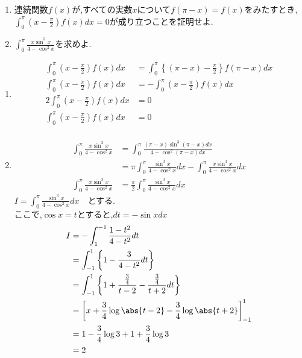 \begin{problem}
  \begin{enumerate}[(1)\ ]
    \item 連続関数$f(x)$が,すべての実数$x$について$f(\pi-x)=f(x)$をみたすとき,$\displaystyle\int^\pi_0 \left(x-\frac{\pi}2\right) f(x)dx = 0 $が成り立つことを証明せよ.
    \item $\displaystyle\int^\pi_0 \frac{x \sin^3 x}{4-\cos^2 x}$を求めよ.
  \end{enumerate}
\end{problem}
\kaie
\begin{enumerate}
  \item \begin{align*}
          \displaystyle\int^\pi_0 \left(x-\frac{\pi}2\right) f(x)dx
          &= \displaystyle\int^\pi_0 \left\{(\pi-x)-\frac{\pi}2\right\}f(\pi-x)dx \\
          \displaystyle\int^\pi_0 \left(x-\frac{\pi}2\right) f(x)dx
          &= -\displaystyle\int^\pi_0 \left(x-\frac{\pi}2\right) f(x)dx\\
          2\displaystyle\int^\pi_0 \left(x-\frac{\pi}2\right) f(x)dx
          &= 0\\
          \displaystyle\int^\pi_0 \left(x-\frac{\pi}2\right) f(x)dx
          &= 0\\
        \end{align*}
  \item \begin{align*}
          \displaystyle\int^\pi_0 \frac{x \sin^3 x}{4-\cos^2 x}
          &= \displaystyle\int ^\pi_0 \frac{(\pi-x)\sin^3 (\pi-x)dx}{4-\cos^2 (\pi-x)dx}\\
          &= \pi \displaystyle\int^\pi_0 \frac{\sin^3 x}{4-\cos^2 x}dx-\displaystyle\int^\pi_0\frac{x\sin^3 x}{4-\cos^2 x}dx\\
          \displaystyle\int^\pi_0 \frac{x \sin^3 x}{4-\cos^2 x}
          &= \frac {\pi}2\displaystyle\int^\pi_0 \frac{\sin^3 x}{4-\cos^2 x}dx
        \end{align*}
  $I = \displaystyle\int^\pi_0 \frac{\sin^3 x}{4-\cos^2 x}dx$　とする.\\
  ここで,$\cos x = t$とすると,$dt=-\sin x dx$\\
  \begin{align*}
    I &= -\int^{-1}_1 \frac{1-t^2}{4-t^2}dt\\
    &= \int^1_{-1} \left\{1-\frac{3}{4-t^2}dt\right\}\\
    &= \int^1_{-1}\left\{1+\frac{\frac34}{t-2}-\frac{\frac34}{t+2}dt\right\}\\
    &= \left[x+\frac34 \log\abs{t-2}-\frac34\log\abs{t+2}\right]^1_{-1}\\
    &= 1-\frac34\log3+1+\frac34\log3\\
    &= 2
  \end{align*}
\end{enumerate}
